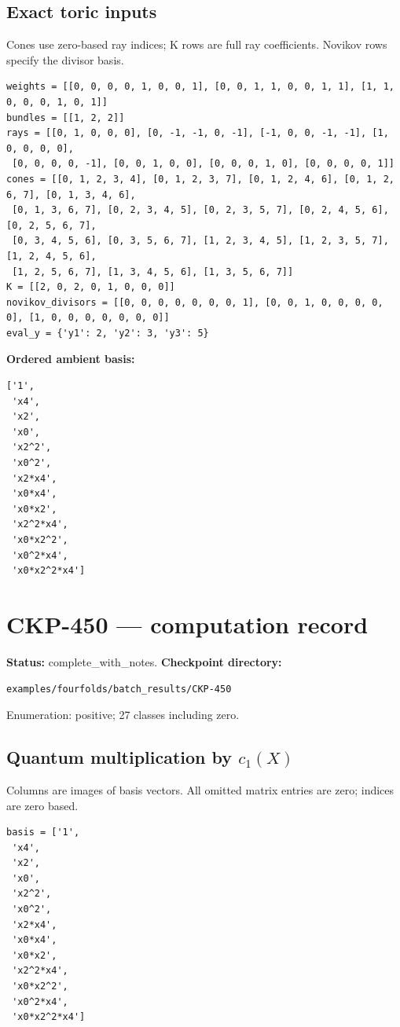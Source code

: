 \documentclass[10pt,a4paper]{article}
\begin{document}
\subsection*{Exact toric inputs}
Cones use zero-based ray indices; K rows are full ray coefficients. Novikov rows specify the divisor basis.

\begin{lstlisting}
weights = [[0, 0, 0, 0, 1, 0, 0, 1], [0, 0, 1, 1, 0, 0, 1, 1], [1, 1, 0, 0, 0, 1, 0, 1]]
bundles = [[1, 2, 2]]
rays = [[0, 1, 0, 0, 0], [0, -1, -1, 0, -1], [-1, 0, 0, -1, -1], [1, 0, 0, 0, 0],
 [0, 0, 0, 0, -1], [0, 0, 1, 0, 0], [0, 0, 0, 1, 0], [0, 0, 0, 0, 1]]
cones = [[0, 1, 2, 3, 4], [0, 1, 2, 3, 7], [0, 1, 2, 4, 6], [0, 1, 2, 6, 7], [0, 1, 3, 4, 6],
 [0, 1, 3, 6, 7], [0, 2, 3, 4, 5], [0, 2, 3, 5, 7], [0, 2, 4, 5, 6], [0, 2, 5, 6, 7],
 [0, 3, 4, 5, 6], [0, 3, 5, 6, 7], [1, 2, 3, 4, 5], [1, 2, 3, 5, 7], [1, 2, 4, 5, 6],
 [1, 2, 5, 6, 7], [1, 3, 4, 5, 6], [1, 3, 5, 6, 7]]
K = [[2, 0, 2, 0, 1, 0, 0, 0]]
novikov_divisors = [[0, 0, 0, 0, 0, 0, 0, 1], [0, 0, 1, 0, 0, 0, 0, 0], [1, 0, 0, 0, 0, 0, 0, 0]]
eval_y = {'y1': 2, 'y2': 3, 'y3': 5}
\end{lstlisting}

\textbf{Ordered ambient basis:}
\begin{lstlisting}
['1',
 'x4',
 'x2',
 'x0',
 'x2^2',
 'x0^2',
 'x2*x4',
 'x0*x4',
 'x0*x2',
 'x2^2*x4',
 'x0*x2^2',
 'x0^2*x4',
 'x0*x2^2*x4']
\end{lstlisting}

\clearpage\section*{CKP-450 --- computation record}
\textbf{Status:} complete\_with\_notes.
\textbf{Checkpoint directory:}
\begin{lstlisting}
examples/fourfolds/batch_results/CKP-450
\end{lstlisting}

Enumeration: positive; 27 classes including zero.
\subsection*{Quantum multiplication by $c_1(X)$}
Columns are images of basis vectors. All omitted matrix entries are zero; indices are zero based.

\begin{lstlisting}
basis = ['1',
 'x4',
 'x2',
 'x0',
 'x2^2',
 'x0^2',
 'x2*x4',
 'x0*x4',
 'x0*x2',
 'x2^2*x4',
 'x0*x2^2',
 'x0^2*x4',
 'x0*x2^2*x4']
\end{lstlisting}
\end{document}
